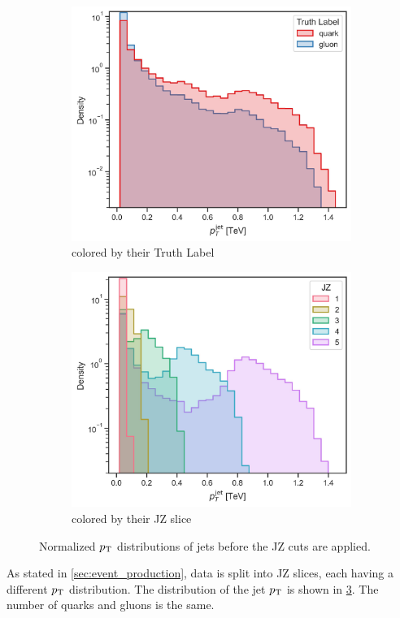 \begin{figure}[htb]
    \centering
    \begin{subfigure}[t]{0.49\textwidth}
        \centering
        \includegraphics[width=\linewidth]{src/plots/pt_jet_label.jpg}
        \caption{colored by their Truth Label}
        \label{fig:jz_all_label}
    \end{subfigure}
    \begin{subfigure}[t]{0.49\textwidth}
        \centering
        \includegraphics[width=\linewidth]{src/plots/pt_jet_jz.jpg}
        \caption{colored by their JZ slice}
        \label{fig:jz_all_jz}
    \end{subfigure}
    \caption{Normalized $p_\text{T}$ distributions of jets before the JZ cuts are applied.}
    \label{fig:jz_all}
\end{figure}
As stated in \cref{sec:event_production}, data is split into JZ slices, each having a different $p_\text{T}$ distribution.
The distribution of the jet $p_\text{T}$ is shown in \cref{fig:jz_all}.
The number of quarks and gluons is the same.

